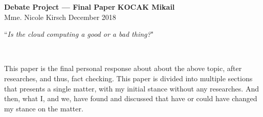 \documentclass[final, a4paper, 9.5pt]{article}
\begin{document}
\noindent
\large\textbf{Debate Project --- Final Paper} \hfill \textbf{KOCAK Mikail} \\
\normalsize Mme. Nicole Kirsch \hfill December 2018 
~\\

{\centering \Large

``\emph{Is the cloud computing a good or a bad thing?}"

}
~

This paper is the final personal response about about the above topic, after researches, and thus, fact checking. This paper is divided into multiple sections that presents a single matter, with my initial stance without any researches. And then, what I, and we, have found and discussed that have or could have changed my stance on the matter.
\end{document}
